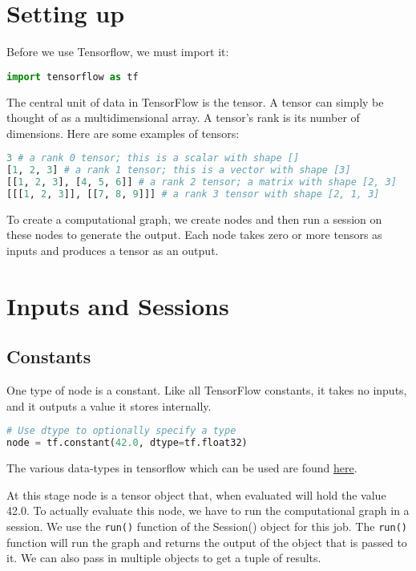 \documentclass[Proceedings]{ascelike}
\begin{document}
\section{Setting up}
Before we use Tensorflow, we must import it:

\begin{lstlisting}[language=Python]
import tensorflow as tf
\end{lstlisting}

The central unit of data in TensorFlow is the tensor. A tensor can simply be thought of as a multidimensional array. A tensor's rank is its number of dimensions. Here are some examples of tensors:

\begin{lstlisting}[language=Python]
3 # a rank 0 tensor; this is a scalar with shape []
[1, 2, 3] # a rank 1 tensor; this is a vector with shape [3]
[[1, 2, 3], [4, 5, 6]] # a rank 2 tensor; a matrix with shape [2, 3]
[[[1, 2, 3]], [[7, 8, 9]]] # a rank 3 tensor with shape [2, 1, 3]
\end{lstlisting}

To create a computational graph, we create nodes and then run a session on these nodes to generate the output. Each node takes zero or more tensors as inputs and produces a tensor as an output.

\section{Inputs and Sessions}

\subsection{Constants}
One type of node is a constant. Like all TensorFlow constants, it takes no inputs, and it outputs a value it stores internally.
\begin{lstlisting}[language=Python]
# Use dtype to optionally specify a type
node = tf.constant(42.0, dtype=tf.float32)
\end{lstlisting}

The various data-types in tensorflow which can be used are found \href{https://www.tensorflow.org/programmers_guide/dims_types}{here}.

At this stage node is a tensor object that, when evaluated will hold the value 42.0. To actually evaluate this node, we have to run the computational graph in a session. We use the \texttt{run()} function of the Session() object for this job. The \texttt{run()} function will run the graph and returns the output of the object that is passed to it. We can also pass in multiple objects to get a tuple of results.
\end{document}
